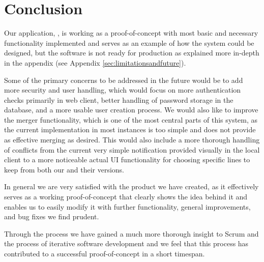 \section{Conclusion}
Our application, \SOP{}, is working as a proof-of-concept with most basic and necessary functionality implemented and serves as an example of how the system could be designed, but the software is not ready for production as explained more in-depth in the appendix (see Appendix \ref{sec:limitationsandfuture}).

Some of the primary concerns to be addressed in the future would be to add more security and user handling, which would focus on more authentication checks primarily in web client, better handling of password storage in the database, and a more usable user creation process. We would also like to improve the merger functionality, which is one of the most central parts of this system, as the current implementation in most instances is too simple and does not provide as effective merging as desired. This would also include a more thorough handling of conflicts from the current very simple notification provided visually in the local client to a more noticeable actual UI functionality for choosing specific lines to keep from both our and their versions.

In general we are very satisfied with the product we have created, as it effectively serves as a working proof-of-concept that clearly shows the idea behind it and enables us to easily modify it with further functionality, general improvements, and bug fixes we find prudent.

Through the process we have gained a much more thorough insight to Scrum and the process of iterative software development and we feel that this process has contributed to a successful proof-of-concept in a short timespan.
